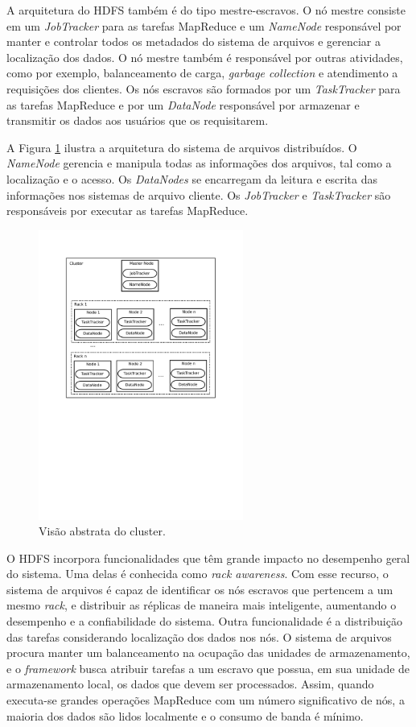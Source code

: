 A arquitetura do HDFS também é do tipo mestre-escravos. 
O nó mestre consiste em um \textit{JobTracker}  para as tarefas MapReduce e um \textit{NameNode}  responsável por manter e controlar todos os metadados do sistema de arquivos e gerenciar a localização dos dados. O nó mestre também é responsável por outras atividades, como por exemplo, balanceamento de carga, \textit{garbage collection} e atendimento a requisições dos clientes.
Os nós escravos são formados por um \textit{TaskTracker}  para as tarefas MapReduce e por um \textit{DataNode} responsável por armazenar e transmitir os dados aos usuários que os requisitarem.

A Figura \ref{fig:hdfs} ilustra a arquitetura do sistema de arquivos distribuídos.
O \textit{NameNode} gerencia e manipula todas as informações dos arquivos, tal como a localização e o acesso. Os \textit{DataNodes} se encarregam da leitura e escrita das informações nos sistemas de arquivo cliente. Os \textit{JobTracker} e \textit{TaskTracker} são responsáveis por executar as tarefas MapReduce.
\begin{figure}[htb]
\centering
\includegraphics[trim=2cm 12cm 2cm 2cm, width=0.6\textwidth]{figuras/HadoopCluster.pdf}
\caption{Visão abstrata do cluster.}
\label{fig:hdfs}
\end{figure}

O HDFS incorpora funcionalidades que têm grande impacto no desempenho geral do sistema.
Uma delas é conhecida como \textit{rack awareness}. Com esse recurso, o sistema de arquivos é capaz de identificar os nós escravos que pertencem a um mesmo \textit{rack}, e distribuir as réplicas de maneira mais inteligente, aumentando o desempenho e a confiabilidade do sistema.
Outra funcionalidade é a distribuição das tarefas considerando localização dos dados nos nós. O sistema de arquivos procura manter um balanceamento na ocupação das unidades de armazenamento, e o \textit{framework} busca atribuir tarefas a um escravo que possua, em sua unidade de armazenamento local, os dados que devem ser processados.
Assim, quando executa-se grandes operações MapReduce com um número significativo de nós, a maioria dos dados são lidos localmente e o consumo de banda é mínimo.